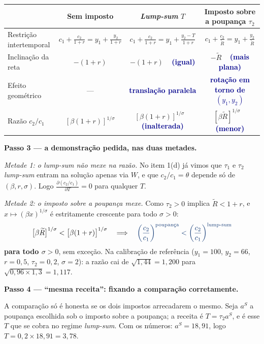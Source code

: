 \documentclass[11pt, a4paper]{article}
\newcommand{\passo}[1]{\medskip\noindent\textbf{#1}\par\nobreak}
\newcommand{\resp}[1]{%
  \ifmmode {\color{darkblue}#1}\else\textcolor{darkblue}{\textbf{#1}}\fi}
\newcommand{\Rt}{\widetilde{R}}
\begin{document}
\begin{center}
\small
\renewcommand{\arraystretch}{1.5}
\begin{tabular}{@{}lccc@{}}
\toprule
& \textbf{Sem imposto} & \textbf{\emph{Lump-sum} $T$} & \textbf{Imposto sobre a poupança $\tau_2$} \\
\midrule
Restrição intertemporal
  & $c_1+\frac{c_2}{1+r}=y_1+\frac{y_2}{1+r}$
  & $c_1+\frac{c_2}{1+r}=y_1+\frac{y_2-T}{1+r}$
  & $c_1+\frac{c_2}{\Rt}=y_1+\frac{y_2}{\Rt}$ \\
Inclinação da reta
  & $-(1+r)$ & $-(1+r)$ \ \resp{(igual)} & $-\Rt$ \ \resp{(mais plana)} \\
Efeito geométrico
  & --- & \resp{translação paralela} & \resp{rotação em torno de $(y_1,y_2)$} \\
Razão $c_2/c_1$
  & $[\beta(1+r)]^{1/\sigma}$
  & $[\beta(1+r)]^{1/\sigma}$ \ \resp{(inalterada)}
  & $[\beta\Rt]^{1/\sigma}$ \ \resp{(menor)} \\
\bottomrule
\end{tabular}
\end{center}

\passo{Passo 3 --- a demonstração pedida, nas duas metades.}

\emph{Metade 1: o \emph{lump-sum} não mexe na razão.} No item 1(d) já vimos que
$\tau_1$ e $\tau_2$ \emph{lump-sum} entram na solução apenas via $W$, e que
$c_2/c_1=\theta$ depende só de $(\beta,r,\sigma)$. Logo
$\frac{\partial (c_2/c_1)}{\partial T}=0$ para qualquer $T$. \checkmark

\emph{Metade 2: o imposto sobre a poupança mexe.} Como $\tau_2>0$ implica $\Rt<1+r$, e
$x\mapsto(\beta x)^{1/\sigma}$ é estritamente crescente para todo $\sigma>0$:
$$\big[\beta\Rt\big]^{1/\sigma} < \big[\beta(1+r)\big]^{1/\sigma}
\quad\Longrightarrow\quad
\resp{\left(\frac{c_2}{c_1}\right)^{\text{poupança}} < \left(\frac{c_2}{c_1}\right)^{\text{lump-sum}}}$$
\textbf{para todo $\sigma>0$}, sem exceção. Na calibração de referência ($y_1=100$,
$y_2=66$, $r=0{,}5$, $\tau_2=0{,}2$, $\sigma=2$): a razão cai de $\sqrt{1{,}44}=1{,}200$
para $\sqrt{0{,}96\times1{,}3}=1{,}117$.

\passo{Passo 4 --- ``mesma receita'': fixando a comparação corretamente.}
A comparação só é honesta se os dois impostos arrecadarem o mesmo. Seja $a^S$ a poupança
escolhida sob o imposto sobre a poupança; a receita é $T = \tau_2 a^S$, e é esse $T$ que se
cobra no regime \emph{lump-sum}. Com os números: $a^S=18{,}91$, logo
$T=0{,}2\times18{,}91=3{,}78$.
\end{document}
